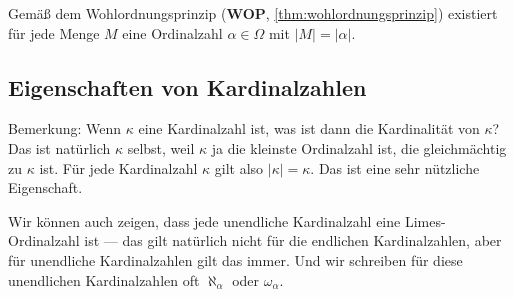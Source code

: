\begin{math-stroke}
Gemäß dem Wohlordnungsprinzip (\textbf{WOP}, \cref{thm:wohlordnungsprinzip}) existiert für jede Menge $M$ eine Ordinalzahl $\alpha \in \Omega$ mit $|M| = |\alpha|$.

\end{math-stroke}

\subsection{Eigenschaften von Kardinalzahlen}

\begin{spoken-clean}[00:57:32 - 00:59:25]
Bemerkung: Wenn $\kappa$ eine Kardinalzahl ist, was ist dann die Kardinalität von $\kappa$? Das ist natürlich $\kappa$ selbst, weil $\kappa$ ja die kleinste Ordinalzahl ist, die gleichmächtig zu $\kappa$ ist. Für jede Kardinalzahl $\kappa$ gilt also $|\kappa| = \kappa$. Das ist eine sehr nützliche Eigenschaft.

Wir können auch zeigen, dass jede unendliche Kardinalzahl eine Limes-Ordinalzahl ist --- das gilt natürlich nicht für die endlichen Kardinalzahlen, aber für unendliche Kardinalzahlen gilt das immer. Und wir schreiben für diese unendlichen Kardinalzahlen oft $\aleph_\alpha$ oder $\omega_\alpha$.
\end{spoken-clean}

\begin{math-stroke}

\end{math-stroke}

